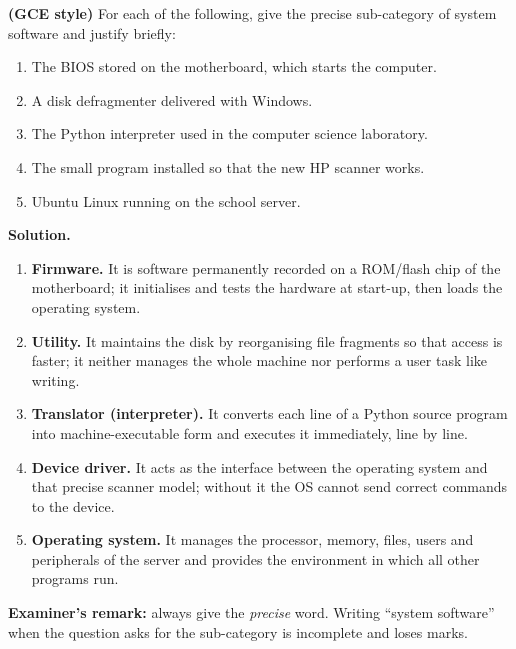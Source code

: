 \documentclass[11pt]{article}
\begin{document}
\begin{exoresolu}
\textbf{(GCE style)} For each of the following, give the precise sub-category of system software and justify briefly:
\begin{enumerate}
\item[a)] The BIOS stored on the motherboard, which starts the computer.
\item[b)] A disk defragmenter delivered with Windows.
\item[c)] The Python interpreter used in the computer science laboratory.
\item[d)] The small program installed so that the new HP scanner works.
\item[e)] Ubuntu Linux running on the school server.
\end{enumerate}
\tcblower
\textbf{Solution.}
\begin{enumerate}
\item[a)] \textbf{Firmware.} It is software permanently recorded on a ROM/flash chip of the motherboard; it initialises and tests the hardware at start-up, then loads the operating system.
\item[b)] \textbf{Utility.} It maintains the disk by reorganising file fragments so that access is faster; it neither manages the whole machine nor performs a user task like writing.
\item[c)] \textbf{Translator (interpreter).} It converts each line of a Python source program into machine-executable form and executes it immediately, line by line.
\item[d)] \textbf{Device driver.} It acts as the interface between the operating system and that precise scanner model; without it the OS cannot send correct commands to the device.
\item[e)] \textbf{Operating system.} It manages the processor, memory, files, users and peripherals of the server and provides the environment in which all other programs run.
\end{enumerate}
\textbf{Examiner's remark:} always give the \emph{precise} word. Writing ``system software'' when the question asks for the sub-category is incomplete and loses marks.
\end{exoresolu}
\end{document}
